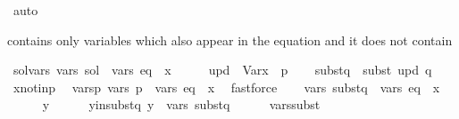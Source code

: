 \begin{isabellebody}
\ auto\isanewline
{}\isamarkupfalse%
%
\endisatagproof
{\isafoldproof}%
%
\isadelimproof
%
\endisadelimproof
%
\begin{isamarkuptext}%
 contains only variables which also appear in the equation and it does not contain %
\end{isamarkuptext}\isamarkuptrue%
\isamarkupfalse%
\ sol{\isacharunderscore}{\kern0pt}vars{\isacharcolon}{\kern0pt}\ {\isachardoublequoteopen}vars\ sol\ {\isasymsubseteq}\ vars\ eq\ {\isacharminus}{\kern0pt}\ {\isacharbraceleft}{\kern0pt}x{\isacharbraceright}{\kern0pt}{\isachardoublequoteclose}\isanewline
%
\isadelimproof
%
\endisadelimproof
%
\isatagproof
{}\isamarkupfalse%
\ {\isacharminus}{\kern0pt}\isanewline
\ \ \isamarkupfalse%
\ {\isacharquery}{\kern0pt}upd\ {\isacharequal}{\kern0pt}\ {\isachardoublequoteopen}Var{\isacharparenleft}{\kern0pt}x\ {\isacharcolon}{\kern0pt}{\isacharequal}{\kern0pt}\ p{\isacharparenright}{\kern0pt}{\isachardoublequoteclose}\isanewline
\ \ \isamarkupfalse%
\ {\isacharquery}{\kern0pt}subst{\isacharunderscore}{\kern0pt}q\ {\isacharequal}{\kern0pt}\ {\isachardoublequoteopen}subst\ {\isacharquery}{\kern0pt}upd\ q{\isachardoublequoteclose}\isanewline
\ \ \isamarkupfalse%
\ x{\isacharunderscore}{\kern0pt}not{\isacharunderscore}{\kern0pt}in{\isacharunderscore}{\kern0pt}p\ \isamarkupfalse%
\ vars{\isacharunderscore}{\kern0pt}p{\isacharcolon}{\kern0pt}\ {\isachardoublequoteopen}vars\ p\ {\isasymsubseteq}\ vars\ eq\ {\isacharminus}{\kern0pt}\ {\isacharbraceleft}{\kern0pt}x{\isacharbraceright}{\kern0pt}{\isachardoublequoteclose}\ \isamarkupfalse%
\ fastforce\isanewline
\isanewline
\ \ \isamarkupfalse%
\ {\isachardoublequoteopen}vars\ {\isacharquery}{\kern0pt}subst{\isacharunderscore}{\kern0pt}q\ {\isasymsubseteq}\ vars\ eq\ {\isacharminus}{\kern0pt}\ {\isacharbraceleft}{\kern0pt}x{\isacharbraceright}{\kern0pt}{\isachardoublequoteclose}\isanewline
\ \ \isamarkupfalse%
\isanewline
\ \ \ \ \isamarkupfalse%
\ y\isanewline
\ \ \ \ \isamarkupfalse%
\ y{\isacharunderscore}{\kern0pt}in{\isacharunderscore}{\kern0pt}subst{\isacharunderscore}{\kern0pt}q{\isacharcolon}{\kern0pt}\ {\isachardoublequoteopen}y\ {\isasymin}\ vars\ {\isacharquery}{\kern0pt}subst{\isacharunderscore}{\kern0pt}q{\isachardoublequoteclose}\isanewline
\ \ \ \ \isamarkupfalse%
\ vars{\isacharunderscore}{\kern0pt}subst\ \isamarkupfalse%

\end{isabellebody}
